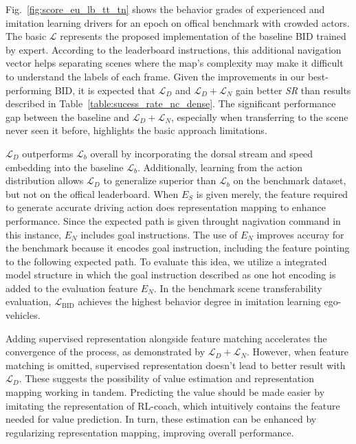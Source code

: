 Fig.~\ref{fig:score_eu_lb_tt_tn} shows the behavior grades of experienced and imitation learning drivers for an epoch on offical benchmark with crowded actors.
The basic $\mathcal{L}$ represents the proposed implementation of the baseline BID trained by expert. 
According to the leaderboard instructions, this additional navigation vector helps separating scenes where the map's complexity may make it difficult to understand the labels of each frame.
Given the improvements in our best-performing BID, it is expected that $\mathcal{L}_D$ and $\mathcal{L}_D + \mathcal{L}_N$ gain better \emph{SR} than results described in Table~\ref{table:sucess_rate_nc_dense}.
The significant performance gap between the baseline and $\mathcal{L}_D + \mathcal{L}_N$, especially when transferring to the scene never seen it before, highlights the basic approach limitations.


$\mathcal{L}_D$ outperforms $\mathcal{L}_b$ overall by incorporating the dorsal stream and speed embedding into the baseline $\mathcal{L}_b$.
Additionally, learning from the action distribution allows $\mathcal{L}_D$ to generalize superior than $\mathcal{L}_b$ on the benchmark dataset, but not on the offical leaderboard.
When $E_S$ is given merely, the feature required to generate accurate driving action does representation mapping to enhance performance.
Since the expected path is given throught nagivation command in this instance, $E_N$ includes goal instructions.
The use of $E_N$ improves accuray for the benchmark because it encodes goal instruction, including the feature pointing to the following expected path.
To evaluate this idea, we utilize a integrated model structure in which the goal instruction described as one hot encoding is added to the evaluation feature $E_N$.
In the benchmark scene transferability evaluation, $\mathcal{L}_\text{BID}$ achieves the highest behavior degree in imitation learning ego-vehicles.



%
Adding supervised representation alongside feature matching accelerates the convergence of the process, as demonstrated by $\mathcal{L}_D + \mathcal{L}_N$.
However, when feature matching is omitted, supervised representation doesn't lead to better result with $\mathcal{L}_D$.
These suggests the possibility of value estimation and representation mapping working in tandem.
Predicting the value should be made easier by imitating the representation of RL-coach, which intuitively contains the feature needed for value prediction. 
In turn, these estimation can be enhanced by regularizing representation mapping, improving overall performance.


